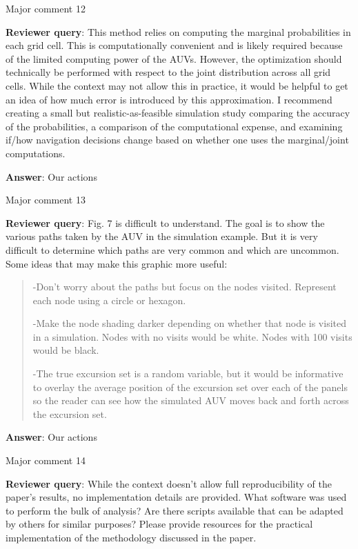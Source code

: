 \documentclass[a4paper]{article}
\def\reply{\textbf{Reviewer query}}
\def\action{\textbf{Answer}}
\begin{document}
\begin{answers}
\item{Major comment 12}\label{q23}

\reply: This method relies on computing the marginal probabilities in each grid cell. This is computationally convenient and is likely required because of the limited computing power of the AUVs. However, the optimization should technically be performed with respect to the joint distribution across all grid cells. While the context may not allow this in practice, it would be helpful to get an idea of how much error is introduced by this approximation. I recommend creating a small but realistic-as-feasible simulation study comparing the accuracy of the probabilities, a comparison of the computational expense, and examining if/how navigation decisions change based on whether one uses the marginal/joint computations. 

\action: Our actions

\item{Major comment 13}\label{q24}

\reply: Fig. 7 is difficult to understand. The goal is to show the various paths taken by the AUV in the
simulation example. But it is very difficult to determine which paths are very common and which
are uncommon. Some ideas that may make this graphic more useful:

\begin{quote}
-Don’t worry about the paths but focus on the nodes visited. Represent each node using a circle or hexagon.\par
-Make the node shading darker depending on whether that node is visited in a
simulation. Nodes with no visits would be white. Nodes with 100 visits would be black.\par
-The true excursion set is a random variable, but it would be informative to overlay the
average position of the excursion set over each of the panels so the reader can see how
the simulated AUV moves back and forth across the excursion set.
\end{quote}

\action: Our actions

\item{Major comment 14}\label{q25}

\reply: While the context doesn’t allow full reproducibility of the paper’s results, no implementation details are provided. What software was used to perform the bulk of analysis? Are there scripts available that can be adapted by others for similar purposes? Please provide resources for the practical implementation of the methodology discussed in the paper.


\end{answers}
\end{document}
